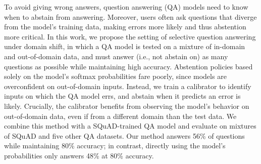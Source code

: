 To avoid giving wrong answers, question answering (QA) models need to know when to abstain from answering. Moreover, users often ask questions that diverge from the model's training data, making errors more likely and thus abstention more critical. In this work, we propose the setting of selective question answering under domain shift, in which a QA model is tested on a mixture of in-domain and out-of-domain data, and must answer (i.e., not abstain on) as many questions as possible while maintaining high accuracy. Abstention policies based solely on the model's softmax probabilities fare poorly, since models are overconfident on out-of-domain inputs. Instead, we train a calibrator to identify inputs on which the QA model errs, and abstain when it predicts an error is likely. Crucially, the calibrator benefits from observing the model's behavior on out-of-domain data, even if from a different domain than the test data. We combine this method with a SQuAD-trained QA model and evaluate on mixtures of SQuAD and five other QA datasets. Our method answers 56\% of questions while maintaining 80\% accuracy; in contrast, directly using the model's probabilities only answers 48\% at 80\% accuracy.
